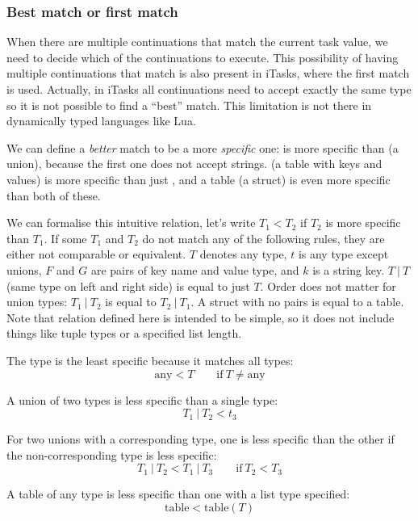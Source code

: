 \subsubsection{Best match or first match}
When there are multiple continuations that match the current task value, we need to decide which of the continuations to execute. This possibility of having multiple continuations that match is also present in iTasks, where the first match is used. Actually, in iTasks all continuations need to accept exactly the same type so it is not possible to find a ``best'' match. This limitation is not there in dynamically typed languages like Lua.

We can define a \textit{better} match to be a more \textit{specific} one:  is more specific than  (a union), because the first one does not accept strings.  (a table with  keys and  values) is more specific than just , and a table  (a struct) is even more specific than both of these.


We can formalise this intuitive relation, let's write $T_1 < T_2$ if $T_2$ is more specific than $T_1$. If some $T_1$ and $T_2$ do not match any of the following rules, they are either not comparable or equivalent. $T$ denotes any type, $t$ is any type except unions, $F$ and $G$ are pairs of key name and value type, and $k$ is a string key. $T\ |\ T$ (same type on left and right side) is equal to just $T$. Order does not matter for union types: $T_1\ |\ T_2$ is equal to $T_2\ |\ T_1$. A struct with no pairs is equal to a table. Note that relation defined here is intended to be simple, so it does not include things like tuple types or a specified list length.

The  type is the least specific because it matches all types:
\[ \mathrm{any} < T \qquad\mathrm{if~} T \neq \mathrm{any} \]

A union of two types is less specific than a single type:
\[ T_1\ |\ T_2 < t_3 \]

For two unions with a corresponding type, one is less specific than the other if the non-corresponding type is less specific:
\[ T_1\ |\ T_2 < T_1\ |\ T_3 \qquad\mathrm{if~} T_2 < T_3 \]

A table of any type is less specific than one with a list type specified:
\[ \mathrm{table} < \mathrm{table}(T) \]

